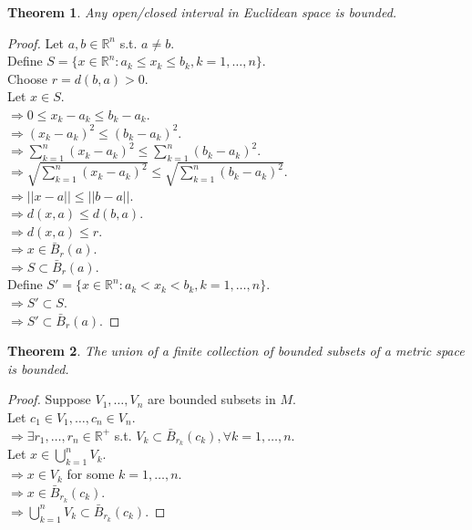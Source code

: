 \documentclass{article}
\newtheorem{theorem}{Theorem}[section]
\begin{document}
			\begin{theorem}
				Any open/closed interval in Euclidean space is bounded.
			\end{theorem}
			\begin{proof} 
				Let $a, b \in \mathbb{R}^n$ s.t. $a \neq b$. \\
				Define $S = \{ x \in \mathbb{R}^n: a_k \leq x_k \leq b_k, k = 1, \ldots, n \}$. \\
				Choose $r = d(b, a) > 0$. \\
				Let $x \in S$. \\
				$\Rightarrow 0 \leq x_k - a_k \leq b_k - a_k$. \\
				$\Rightarrow (x_k - a_k)^2 \leq (b_k - a_k)^2$. \\
				$\Rightarrow \sum \limits_{k=1}^n (x_k - a_k)^2 \leq \sum \limits_{k=1}^n (b_k - a_k)^2$. \\
				$\Rightarrow \sqrt{\sum \limits_{k=1}^n (x_k - a_k)^2} \leq \sqrt{\sum \limits_{k=1}^n (b_k - a_k)^2}$. \\
				$\Rightarrow ||x - a|| \leq ||b - a||$. \\
				$\Rightarrow d(x, a) \leq d(b, a)$. \\
				$\Rightarrow d(x, a) \leq r$. \\
				$\Rightarrow x \in \bar{B}_r(a)$. \\
				$\Rightarrow S \subset \bar{B}_r(a)$. \\

				Define $S' = \{ x \in \mathbb{R}^n: a_k < x_k < b_k, k = 1, \ldots, n \}$. \\
				$\Rightarrow S' \subset S$. \\
				$\Rightarrow S' \subset \bar{B}_r(a)$.
			\end{proof}

			\begin{theorem}
				The union of a finite collection of bounded subsets of a metric space is bounded.
			\end{theorem}
			\begin{proof}
				Suppose $V_1, \ldots, V_n$ are bounded subsets in $M$. \\
				Let $c_1 \in V_1, \ldots, c_n \in V_n$. \\
				$\Rightarrow \exists r_1, \ldots, r_n \in \mathbb{R}^+$ s.t. $V_{k} \subset \bar{B}_{r_k}(c_k), \forall k = 1, \ldots, n$. \\
				Let $x \in \bigcup_{k=1}^{n} V_k$. \\
				$\Rightarrow x \in V_k$ for some $k = 1, \ldots, n$. \\
				$\Rightarrow x \in \bar{B}_{r_k}(c_k)$. \\
				$\Rightarrow \bigcup_{k=1}^{n} V_k \subset  \bar{B}_{r_k}(c_k)$.
			\end{proof}
\end{document}
